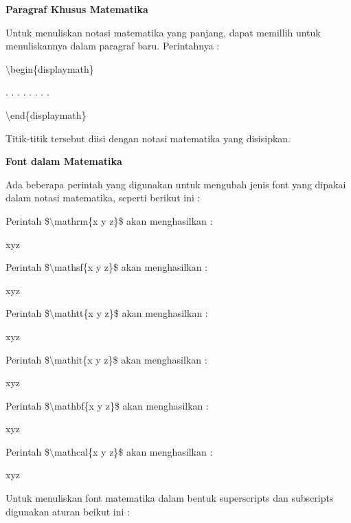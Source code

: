 \textbf{Paragraf Khusus Matematika}
\par \vspace{12pt}
Untuk menuliskan notasi matematika yang panjang, dapat memillih untuk menuliskannya dalam paragraf baru. Perintahnya :
\par \vspace{12pt}
$\setminus$begin\{displaymath\}
\par \vspace{12pt}
. . . . . . . .
\par \vspace{12pt}
$\setminus$end\{displaymath\}
\par \vspace{12pt}


Titik-titik tersebut diisi dengan notasi matematika yang disisipkan.
\par \vspace{12pt}
\textbf{Font dalam Matematika}
\par \vspace{12pt}
Ada beberapa perintah yang digunakan untuk mengubah jenis font yang dipakai dalam notasi matematika, seperti berikut ini :
\par \vspace{12pt}
Perintah \$$\setminus$mathrm\{x y z\}\$ 
akan menghasilkan :

xyz
\par \vspace{12pt}
Perintah \$$\setminus$mathsf\{x y z\}\$ 
akan menghasilkan :

xyz
\par \vspace{12pt}
Perintah \$$\setminus$mathtt\{x y z\}\$ 
akan menghasilkan :

xyz
\par \vspace{12pt}
Perintah \$$\setminus$mathit\{x y z\}\$ 
akan menghasilkan :

xyz\par \vspace{12pt}



Perintah \$$\setminus$mathbf\{x y z\}\$ 
akan menghasilkan :

xyz
\par \vspace{12pt}
Perintah \$$\setminus$mathcal\{x y z\}\$ 
akan menghasilkan :

xyz
\par \vspace{12pt}
Untuk menuliskan font matematika dalam bentuk superscripts dan 
subscripts digunakan aturan beikut ini :\par \vspace{12pt}


